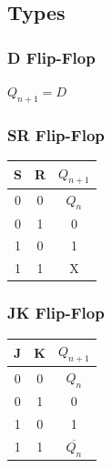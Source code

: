 \documentclass[11pt]{article}
\begin{document}
\subsection*{Types}
\begin{multicols}{2}

\subsubsection*{D Flip-Flop}
    \begin{minipage}{\linewidth}
        \begin{center}
            $Q_{n+1} = D$
        \end{center}
    \end{minipage}

\subsubsection*{SR Flip-Flop}
    \begin{minipage}{\linewidth}
        \begin{center}
            \begin{tabular}{ |c|c|c| } 
                \hline
                S & R & $Q_{n+1}$ \\
                \hline
                0 & 0 & $Q_n$ \\
                \hline
                0 & 1 & 0 \\
                \hline
                1 & 0 & 1 \\
                \hline
                1 & 1 & X \\
                \hline
            \end{tabular}
        \end{center}
    \end{minipage}

\subsubsection*{JK Flip-Flop}
    \begin{minipage}{\linewidth}
        \begin{center}
            \begin{tabular}{ |c|c|c| } 
                \hline
                J & K & $Q_{n+1}$ \\
                \hline
                0 & 0 & $Q_n$ \\
                \hline
                0 & 1 & 0 \\
                \hline
                1 & 0 & 1 \\
                \hline
                1 & 1 & $\overline{Q_n}$ \\
                \hline
            \end{tabular}
        \end{center}
    \end{minipage}


\end{multicols}
\end{document}
